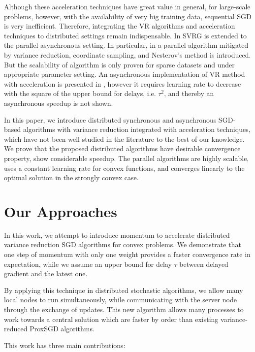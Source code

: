 \documentclass{article}
\theoremstyle{definition}
\theoremstyle{remark}
\begin{document}
Although these acceleration techniques have great value in general, for large-scale problems, however, with the availability of very big training data, sequential SGD is very inefficient. Therefore, integrating the VR algorithms and acceleration techniques to distributed settings remain indispensable. In \cite{Mania2017, Reddi2015} SVRG is extended to the parallel asynchronous setting. In particular, in \cite{Meng2016} a parallel algorithm mitigated by variance reduction, coordinate sampling, and Nesterov’s method is introduced. But the scalability of algorithm is only proven for sparse datasets and under appropriate parameter setting. An asynchronous implementation of VR method with acceleration is presented in \cite{fang2018accelerating}, however it requires learning rate to decrease with the square  of the upper bound for delays, i.e. $\tau^2$, and thereby an asynchronous speedup is not shown. 


In this paper, we introduce distributed synchronous and asynchronous SGD-based algorithms with variance reduction integrated with acceleration techniques, which have not been well studied in the literature to the best of our knowledge. We prove that the proposed distributed algorithms have desirable convergence property, show considerable speedup. The parallel algorithms are highly scalable, uses a constant learning rate for convex functions, and converges linearly to the optimal solution in the strongly convex case.

\section{Our Approaches}
In this work, we attempt to introduce momentum to accelerate distributed variance reduction SGD algorithms for convex problems. We demonstrate that one step of momentum with only one weight provides a faster convergence rate in expectation, while we assume an upper bound for delay $\tau$ between delayed gradient and the latest one. 

By applying this technique in distributed stochastic algorithms, we allow many local nodes to run simultaneously, while communicating 
with the server node through the exchange of updates. This new algorithm allows many processes to work towards a central solution which are
faster by order than existing variance-reduced ProxSGD algorithms. 

This work has three main contributions:
\end{document}
